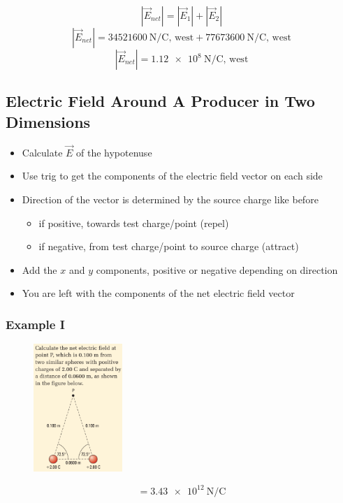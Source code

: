 \documentclass[a4paper,12pt]{article}
\begin{document}
$$|\vec{E}_{net}| = |\vec{E}_1| + |\vec{E}_2|$$
$$|\vec{E}_{net}| = \SI{34521600}{\newton\per\coulomb}\textrm{, west} + \SI{77673600}{\newton\per\coulomb}\textrm{, west}$$
$$|\vec{E}_{net}| = \SI{1.12e8}{\newton\per\coulomb}\textrm{, west}$$

\pagebreak
\subsection{Electric Field Around A Producer in Two Dimensions}
\begin{itemize}
    \item{Calculate $\vec{E}$ of the hypotenuse}
    \item{Use trig to get the components of the electric field vector on each side}
\item{
    Direction of the vector is determined by the source charge like before
        \begin{itemize}
            \item{if positive, towards test charge/point (repel)}
            \item{if negative, from test charge/point to source charge (attract)}
        \end{itemize}
    }
    \item{Add the $x$ and $y$ components, positive or negative depending on direction}
    \item{You are left with the components of the net electric field vector}
\end{itemize}

\subsubsection{Example I}
\begin{figure}[H]
    \centering
    \includegraphics[width=0.3\textwidth]{fieldtriangle}
\end{figure}
$$= \SI{3.43e12}{\newton\per\coulomb}$$
\end{document}
